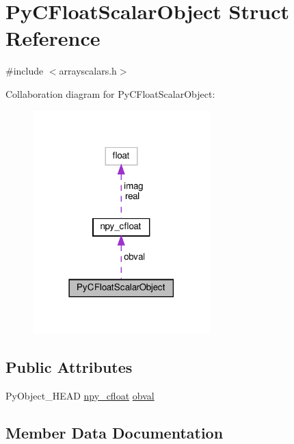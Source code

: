 \hypertarget{structPyCFloatScalarObject}{}\section{Py\+C\+Float\+Scalar\+Object Struct Reference}
\label{structPyCFloatScalarObject}


{\ttfamily \#include $<$arrayscalars.\+h$>$}



Collaboration diagram for Py\+C\+Float\+Scalar\+Object\+:
\nopagebreak
\begin{figure}[H]
\begin{center}
\leavevmode
\includegraphics[width=194pt]{structPyCFloatScalarObject__coll__graph}
\end{center}
\end{figure}
\subsection*{Public Attributes}
\begin{DoxyCompactItemize}
\item 
Py\+Object\+\_\+\+H\+E\+AD \hyperlink{structnpy__cfloat}{npy\+\_\+cfloat} \hyperlink{structPyCFloatScalarObject_a02ecbc17085431ac73cb6f073a363641}{obval}
\end{DoxyCompactItemize}


\subsection{Member Data Documentation}
\mbox{\label{structPyCFloatScalarObject_a02ecbc17085431ac73cb6f073a363641}} 
